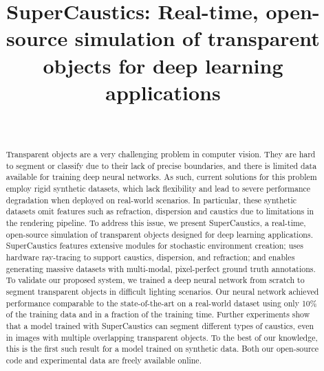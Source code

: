 \documentclass[conference]{IEEEtran}
\begin{document}
\title{SuperCaustics: Real-time, open-source simulation of transparent objects for deep learning applications \\
}

\author{
\and
{}

\\

}









\maketitle


\begin{abstract}
Transparent objects are a very challenging problem in computer vision. They are hard to segment or classify due to their lack of precise boundaries, and there is limited data available for training deep neural networks. As such, current solutions for this problem employ rigid synthetic datasets, which lack flexibility and lead to severe performance degradation when deployed on real-world scenarios. In particular, these synthetic datasets omit features such as refraction, dispersion and caustics due to limitations in the rendering pipeline. To address this issue, we present SuperCaustics, a real-time, open-source simulation of transparent objects designed for deep learning applications. SuperCaustics features extensive modules for stochastic environment creation; uses hardware ray-tracing to support caustics, dispersion, and refraction; and enables generating massive datasets with multi-modal, pixel-perfect ground truth annotations. To validate our proposed system, we trained a deep neural network from scratch to segment transparent objects in difficult lighting scenarios. Our neural network achieved performance comparable to the state-of-the-art on a real-world dataset using only 10\% of the training data and in a fraction of the training time. Further experiments show that a model trained with SuperCaustics can segment different types of caustics, even in images with multiple overlapping transparent objects. To the best of our knowledge, this is the first such result for a model trained on synthetic data. Both our open-source code and experimental data are freely available online. 
\end{abstract}
\end{document}
